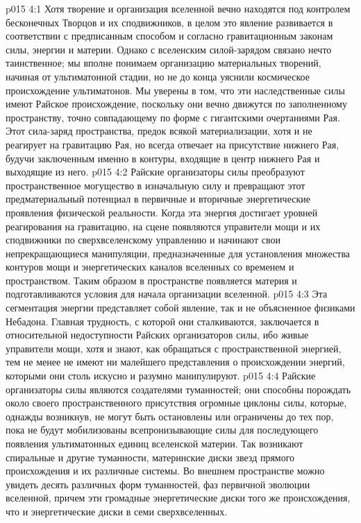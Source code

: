\vs p015 4:1 Хотя творение и организация вселенной вечно находятся под контролем бесконечных Творцов и их сподвижников, в целом это явление развивается в соответствии с предписанным способом и согласно гравитационным законам силы, энергии и материи. Однако с вселенским силой\hyp{}зарядом связано нечто таинственное; мы вполне понимаем организацию материальных творений, начиная от ультиматонной стадии, но не до конца уяснили космическое происхождение ультиматонов. Мы уверены в том, что эти наследственные силы имеют Райское происхождение, поскольку они вечно движутся по заполненному пространству, точно совпадающему по форме с гигантскими очертаниями Рая. Этот сила\hyp{}заряд пространства, предок всякой материализации, хотя и не реагирует на гравитацию Рая, но всегда отвечает на присутствие нижнего Рая, будучи заключенным именно в контуры, входящие в центр нижнего Рая и выходящие из него.
\vs p015 4:2 Райские организаторы силы преобразуют пространственное могущество в изначальную силу и превращают этот предматериальный потенциал в первичные и вторичные энергетические проявления физической реальности. Когда эта энергия достигает уровней реагирования на гравитацию, на сцене появляются управители мощи и их сподвижники по сверхвселенскому управлению и начинают свои непрекращающиеся манипуляции, предназначенные для установления множества контуров мощи и энергетических каналов вселенных со временем и пространством. Таким образом в пространстве появляется материя и подготавливаются условия для начала организации вселенной.
\vs p015 4:3 Эта сегментация энергии представляет собой явление, так и не объясненное физиками Небадона. Главная трудность, с которой они сталкиваются, заключается в относительной недоступности Райских организаторов силы, ибо живые управители мощи, хотя и знают, как обращаться с пространственной энергией, тем не менее не имеют ни малейшего представления о происхождении энергий, которыми они столь искусно и разумно манипулируют.
\vs p015 4:4 \pc Райские организаторы силы являются создателями туманностей; они способны порождать около своего пространственного присутствия огромные циклоны силы, которые, однажды возникнув, не могут быть остановлены или ограничены до тех пор, пока не будут мобилизованы всепронизывающие силы для последующего появления ультиматонных единиц вселенской материи. Так возникают спиральные и другие туманности, материнские диски звезд прямого происхождения и их различные системы. Во внешнем пространстве можно увидеть десять различных форм туманностей, фаз первичной эволюции вселенной, причем эти громадные энергетические диски того же происхождения, что и энергетические диски в семи сверхвселенных.
